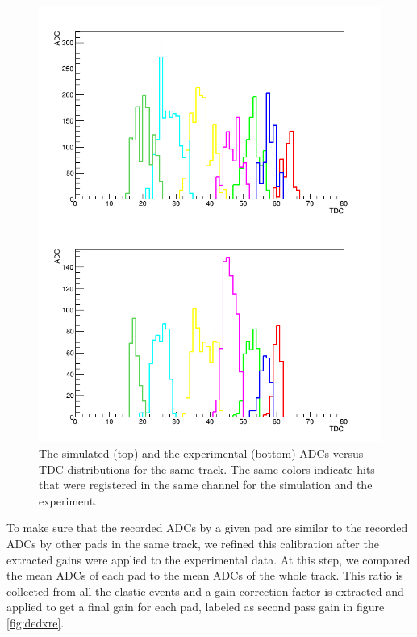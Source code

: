 \begin{figure}[tpb]
\centering
\vspace{-0.1in}
\includegraphics[scale=0.320]{fig_rtpc/EVENT_adc_tdc.png}
\caption{The simulated (top) and the experimental (bottom) ADCs versus TDC 
distributions for the same track. The same colors indicate hits that were 
registered in the same channel for the simulation and the experiment.}
\label{fig:EVENT_adc_tdc}
\end{figure}

To make sure that the recorded ADCs by a given pad are similar to the recorded 
ADCs by other pads in the same track, we refined this calibration after the 
extracted gains were applied to the experimental data. At this step, we 
compared the mean ADCs of each pad to the mean ADCs of the whole track. This 
ratio is collected from all the elastic events and a gain correction factor is 
extracted and applied to get a final gain for each pad, labeled as second pass 
gain in figure \ref{fig:dedxre}. 


